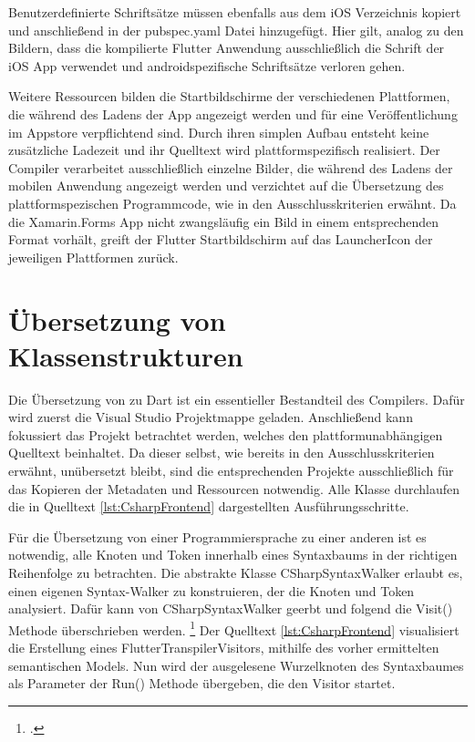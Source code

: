  


Benutzerdefinierte Schriftsätze müssen ebenfalls aus dem iOS Verzeichnis kopiert und anschließend in der pubspec.yaml Datei hinzugefügt.  Hier gilt,  analog zu den Bildern,  dass die kompilierte Flutter Anwendung ausschließlich die Schrift der iOS App verwendet und androidspezifische Schriftsätze verloren gehen.

Weitere Ressourcen bilden die Startbildschirme der verschiedenen Plattformen,  die während des Ladens der App angezeigt werden und für eine Veröffentlichung im Appstore verpflichtend sind.  Durch ihren simplen Aufbau entsteht keine zusätzliche Ladezeit und ihr Quelltext wird plattformspezifisch realisiert.  Der Compiler verarbeitet ausschließlich einzelne Bilder, die während des Ladens der mobilen Anwendung angezeigt werden und verzichtet auf die Übersetzung des plattformspezischen Programmcode, wie in den Ausschlusskriterien erwähnt.  Da die Xamarin.Forms App nicht zwangsläufig ein Bild in einem entsprechenden Format vorhält,  greift der Flutter Startbildschirm auf das LauncherIcon der jeweiligen Plattformen zurück.  

\section{Übersetzung von Klassenstrukturen}

Die Übersetzung von \Csharp zu Dart ist ein essentieller Bestandteil des Compilers.  Dafür wird zuerst die Visual Studio Projektmappe geladen.  Anschließend kann fokussiert das Projekt betrachtet werden, welches den plattformunabhängigen Quelltext beinhaltet.  Da dieser selbst, wie bereits in den Ausschlusskriterien erwähnt,  unübersetzt bleibt, sind die entsprechenden Projekte ausschließlich für das Kopieren der Metadaten und Ressourcen notwendig.  Alle Klasse durchlaufen die in Quelltext \ref{lst:CsharpFrontend} dargestellten Ausführungsschritte. 

Für die Übersetzung von einer Programmiersprache zu einer anderen ist es notwendig,  alle Knoten und Token innerhalb eines Syntaxbaums in der richtigen Reihenfolge zu betrachten.  Die abstrakte Klasse \glq CSharpSyntaxWalker\grq{} erlaubt es,  einen eigenen \glq Syntax-Walker\grq{} zu konstruieren,  der die Knoten und Token analysiert.  Dafür kann von \glq CSharpSyntaxWalker\grq{} geerbt und folgend die \glq Visit()\grq{} Methode überschrieben werden.  \footcite[Vgl.][Abgerufen am \today]{Varty2014}  Der Quelltext \ref{lst:CsharpFrontend} visualisiert die Erstellung eines \glq FlutterTranspilerVisitors\grq ,  mithilfe des vorher ermittelten semantischen Models.  Nun wird der ausgelesene Wurzelknoten des Syntaxbaumes als Parameter der \glq Run()\grq{} Methode übergeben,  die den \glq Visitor\grq{} startet.  

